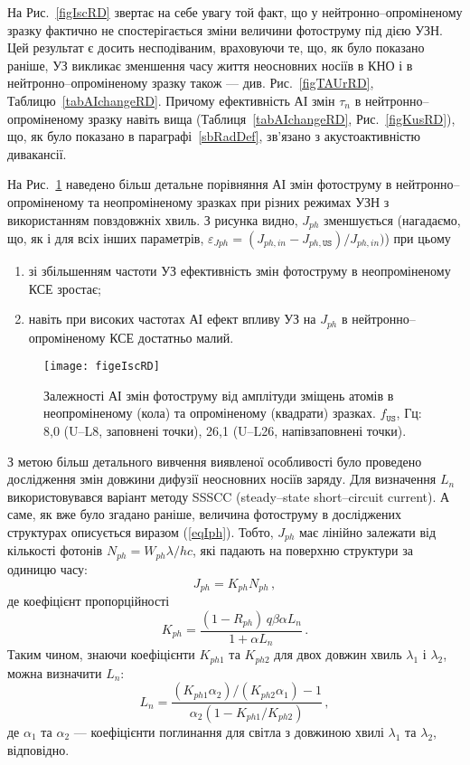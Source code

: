 На Рис.~\ref{figIscRD} звертає на себе увагу той факт, що у нейтронно--опроміненому
зразку фактично не спостерігається зміни величини фотоструму під дією УЗН.
Цей результат є досить несподіваним, враховуючи те, що, як було показано раніше,
УЗ викликає зменшення часу життя неосновних носіїв в КНО і в нейтронно--опроміненому зразку також ---
див. Рис.~\ref{figTAUrRD}, Таблицю~\ref{tabAIchangeRD}.
Причому ефективність АІ змін $\tau_n$ в нейтронно--опроміненому зразку навіть вища (Таблиця~\ref{tabAIchangeRD}, Рис.~\ref{figKusRD}),
що, як було показано в параграфі~\ref{sbRadDef}, зв'язано з акустоактивністю дивакансії.

На Рис.~\ref{figeIscRD} наведено більш детальне порівняння АІ змін фотоструму в нейтронно--опроміненому та неопроміненому
зразках при різних режимах УЗН з використанням повздовжніх хвиль.
З рисунка видно, $J_{ph}$ зменшується (нагадаємо, що, як і для всіх інших параметрів, $\varepsilon_{Jph}=(J_{ph,in}-J_{ph,\mathtt{US}})/{J_{ph,in}})$) при цьому
\begin{enumerate}[label=\asbuk*),leftmargin=0em,itemindent=1.5em]
\item зі збільшенням частоти УЗ ефективність змін фотоструму в неопроміненому КСЕ зростає;
\item навіть при високих частотах АІ ефект впливу УЗ на $J_{ph}$ в нейтронно--опроміненому КСЕ достатньо малий.
\end{enumerate}


\begin{figure}
\center
\texttt{[image: figeIscRD]}
\caption{\label{figeIscRD}
Залежності АІ змін фотоструму від
амплітуди зміщень атомів в неопроміненому (кола)
та опроміненому (квадрати) зразках.
$f_\mathtt{US}$, Гц: 8,0 (U--L8, заповнені точки),
26,1 (U--L26, напівзаповнені точки).
}%
\end{figure}

З метою більш детального вивчення виявленої особливості було проведено дослідження змін
довжини дифузії неосновних носіїв заряду.
Для визначення $L_n$ використовувався варіант методу SSSCC (steady--state short--circuit current)\cite{Schroder2006}.
А саме, як вже було згадано раніше, величина фотоструму в досліджених структурах
описується виразом (\ref{eqIph}).
Тобто, $J_{ph}$ має лінійно залежати від кількості фотонів
\mbox{$N_{ph}=W_{ph}\lambda /hc$}, які падають на поверхню структури за одиницю часу:
\begin{equation}
J_{ph}=K_{ph}N_{ph}\,,
\end{equation}
де коефіцієнт пропорційності
\begin{equation}
 K_{ph}=\frac{(1-R_{ph})\,q\beta \alpha L_n} {1+\alpha L_n}\,.
\end{equation}
Таким чином, знаючи коефіцієнти $K_{ph1}$ та $K_{ph2}$
для двох довжин хвиль $\lambda_1$ і $\lambda_2$, можна
визначити $L_n$:
\begin{equation}\label{F3}
L_n=\frac{(K_{ph1}\alpha_2)/(K_{ph2}\alpha_1)-1}{\alpha_2(1-K_{ph1}/K_{ph2})}\,,
\end{equation}
де $\alpha_1$ та $\alpha_2$ --- коефіцієнти поглинання для
світла з довжиною хвилі $\lambda_1$ та $\lambda_2$, відповідно.

